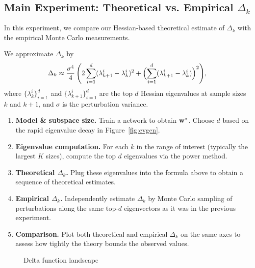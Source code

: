 \documentclass{article}
\begin{document}
\subsection{Main Experiment: Theoretical vs. Empirical \texorpdfstring{$\Delta_k$}{Delta k}}

In this experiment, we compare our Hessian‐based theoretical estimate of $\Delta_k$ with the empirical Monte Carlo measurements.

We approximate $\Delta_k$ by
$$
  \Delta_k \approx
  \frac{\sigma^4}{4}\, \Biggl( 2 \sum_{i=1}^{d} (\lambda_{k+1}^i - \lambda_{k}^i)^2 +
  \Bigl( \sum_{i=1}^{d} (\lambda_{k+1}^i - \lambda_{k}^i) \Bigr)^2 \Biggr),
$$
where $\{\lambda_k^i\}_{i=1}^d$ and $\{\lambda_{k+1}^i\}_{i=1}^d$ are the top $d$ Hessian eigenvalues at sample sizes $k$ and $k + 1$,
and $\sigma$ is the perturbation variance.

\begin{enumerate}
  \item \textbf{Model \& subspace size.} Train a network to obtain $\mathbf{w}^*$. Choose $d$ based on the rapid eigenvalue decay in
        Figure~\ref{fig:evgen}.
  \item \textbf{Eigenvalue computation.} For each $k$ in the range of interest (typically the largest $K$ sizes), compute the top
        $d$ eigenvalues via the power method.
  \item \textbf{Theoretical $\Delta_k$.} Plug these eigenvalues into the formula above to obtain a sequence of theoretical estimates.
  \item \textbf{Empirical $\Delta_k$.} Independently estimate $\Delta_k$ by Monte Carlo sampling of perturbations along the same
        top‐$d$ eigenvectors as it was in the previous experiment.
  \item \textbf{Comparison.} Plot both theoretical and empirical $\Delta_k$ on the same axes to assess how tightly the theory bounds
        the observed values.
\end{enumerate}

\begin{figure}[!htbp]
  \caption{Delta function landscape}
  \label{fig:delta_eigen_comparison}
\end{figure}
\end{document}
